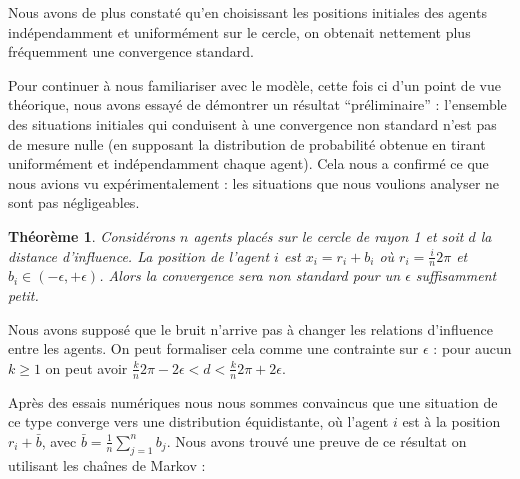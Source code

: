 \documentclass[a4paper,10pt]{article}
\newtheorem{theorem}{Théorème}
\begin{document}
Nous avons de plus constaté qu'en choisissant les positions initiales des agents indépendamment et uniformément sur le cercle, on obtenait nettement plus fréquemment une convergence standard.

Pour continuer à nous familiariser avec le modèle, cette fois ci d'un point de vue théorique, nous avons essayé de démontrer un résultat ``préliminaire'' : l'ensemble des situations initiales qui conduisent à une convergence non standard n'est pas de mesure nulle (en supposant la distribution de probabilité obtenue en tirant uniformément et indépendamment chaque agent). Cela nous a confirmé ce que nous avions vu expérimentalement : les situations que nous voulions analyser ne sont pas négligeables.

\begin{theorem}
\label{convergence-non-standard}
Considérons $n$ agents placés sur le cercle de rayon 1 et soit $d$ la distance d'influence. La position de l'agent $i$ est $x_i = r_i + b_i$ où $r_i = \frac{i}{n} 2 \pi$ et $b_i \in (-\epsilon, +\epsilon)$. Alors la convergence sera non standard pour un $\epsilon$ suffisamment petit.
\end{theorem}

Nous avons supposé que le bruit n'arrive pas à changer les relations d'influence entre les agents. On peut formaliser cela comme une contrainte sur $\epsilon$ : pour aucun $k \ge 1$ on peut avoir $\frac{k}{n} 2 \pi - 2\epsilon < d < \frac{k}{n} 2 \pi + 2\epsilon$.

Après des essais numériques nous nous sommes convaincus que une situation de ce type converge vers une distribution équidistante, où l'agent $i$ est à la position $r_i + \bar b$, avec $\bar b = \frac{1}{n} \sum_{j=1}^n b_j$. Nous avons trouvé une preuve de ce résultat on utilisant les chaînes de Markov :
\end{document}
